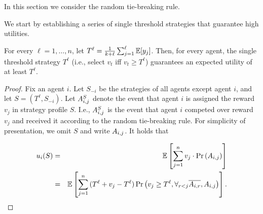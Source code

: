 In this section we consider the random tie-breaking rule. 

We start by establishing a series of single threshold strategies that guarantee high utilities.
\begin{theorem}
		\label{thm:prophet_threshold_inequality}
		For every $\ell=1, \ldots, n$, let $T^\ell = \frac{1}{k+\ell}\sum_{j=1}^{\ell} \E [y_j]$. 
		Then, for every agent, the single threshold strategy $T^{\ell}$ (i.e., select $v_t$ iff $v_t\geq T^\ell$) guarantees an expected utility of at least $T^{\ell}$.
\end{theorem}	
\begin{proof}
	Fix an agent $i$. Let $S_{-i}$ be the strategies of all agents except agent $i$, and let $S=(T^\ell,S_{-i})$.
	Let $\assignn{i}{j}{S}$ denote the event that agent $i$ is assigned the reward $v_j$ in strategy profile $S$. I.e., $\assignn{i}{j}{S}$ is the event that agent $i$ competed over reward $v_j$ and received it according to the random tie-breaking rule. 
	For simplicity of presentation, we omit $S$ and write $\assign{i}{j}$.
	It holds that

\begin{eqnarray*}
	 u_i(S)  & = & \E\left[ \sum_{j=1}^{n}{v_j\cdot \Pr\left(\assign{i}{j}\right)}\right]\\
	& = & \E\left[\sum_{j=1}^{n}{(T^\ell+v_j-T^\ell) \Pr\left(v_j\geq T^\ell,\forall_{r<j}  \overline{\assign{i}{r}},\assign{i}{j}\right)}\right].
\end{eqnarray*}


\end{proof}
